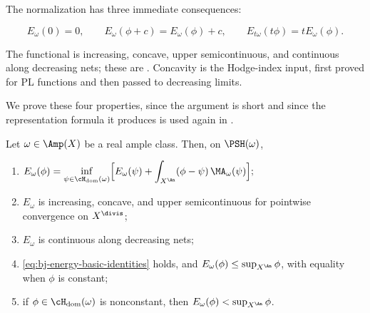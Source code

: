 The normalization has three immediate consequences:

\[
 E_\omega(0)=0,\qquad E_\omega(\phi+c)=E_\omega(\phi)+c,
 \qquad E_{t\omega}(t\phi)=tE_\omega(\phi).
\tag{46.14}\label{eq:bj-energy-basic-identities}
\]

The functional is increasing, concave, upper semicontinuous, and continuous
along decreasing nets; these are \cite[Proposition~7.7]{BJ22}.  Concavity
is the Hodge-index input, first proved for PL functions and then passed to
decreasing limits.

We prove these four properties, since the argument is short and since the
representation formula it produces is used again in
.

\begin{proposition}
\label{prop:ch46-energy-usc}
Let $\omega\in\Amp(X)$ be a real ample class.  Then, on
$\PSH(\omega)$,
\begin{enumerate}
\item\label{itm:ch46-Eusc:rep}
      $\displaystyle
       E_\omega(\phi)
       =\inf_{\psi\in\cH_{\mathrm{dom}}(\omega)}
        \Bigl[E_\omega(\psi)
              +\int_{X^{\An}}(\phi-\psi)\,\MA_\omega(\psi)\Bigr];$
\item\label{itm:ch46-Eusc:props}
      $E_\omega$ is increasing, concave, and upper semicontinuous for
      pointwise convergence on $X^{\divis}$;
\item\label{itm:ch46-Eusc:decreasing}
      $E_\omega$ is continuous along decreasing nets;
\item\label{itm:ch46-Eusc:identities}
      \eqref{eq:bj-energy-basic-identities} holds, and
      $E_\omega(\phi)\le\sup_{X^{\An}}\phi$, with equality when
      $\phi$ is constant;
\item\label{itm:ch46-Eusc:strict}
      if $\phi\in\cH_{\mathrm{dom}}(\omega)$ is nonconstant, then
      $E_\omega(\phi)<\sup_{X^{\An}}\phi$.
\end{enumerate}
\end{proposition}

